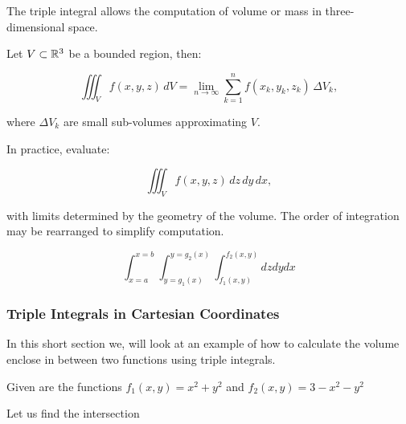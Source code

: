 The triple integral allows the computation of volume or mass in three-dimensional space.

Let \( V \subset \mathbb{R}^3 \) be a bounded region, then:

\[
    \iiint_V f(x, y, z)\, dV = \lim_{n \to \infty} \sum_{k=1}^n f(x_k, y_k, z_k) \, \Delta V_k,
\]

where \( \Delta V_k \) are small sub-volumes approximating \( V \).

In practice, evaluate:

\[
    \iiint_V f(x, y, z)\, dz\, dy\, dx,
\]

with limits determined by the geometry of the volume. The order of integration may be rearranged to 
simplify computation.

\[
    \int_{x=a}^{x=b}\int_{y=g_1(x)}^{y=g_2(x)} \int_{f_1(x,y)}^{f_2(x,y)} dz dy dx
\]

\subsubsection{Triple Integrals in Cartesian Coordinates}

In this short section we, will look at an example of how to calculate the volume enclose in
between two functions using triple integrals.

Given are the functions \(f_1(x,y) = x^2 + y^2\) and \(f_2(x,y) = 3 - x^2 - y^2\)


\begin{center}
    
\end{center}

Let us find the intersection

